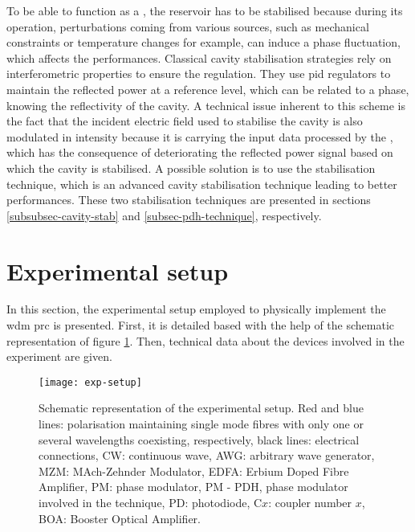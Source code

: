 To be able to function as a \rcer, the reservoir has to be stabilised because during its operation, perturbations coming from various sources, such as mechanical constraints or temperature changes for example, can induce a phase fluctuation, which affects the \rcer performances. Classical cavity stabilisation strategies rely on interferometric properties to ensure the regulation. They use \gls{pid} regulators to maintain the reflected power at a reference level, which can be related to a phase, knowing the reflectivity of the cavity. A technical issue inherent to this scheme is the fact that the incident electric field used to stabilise the cavity is also modulated in intensity because it is carrying the input data processed by the \rcer, which has the consequence of deteriorating the reflected power signal based on which the cavity is stabilised. A possible solution is to use the \pdh stabilisation technique, which is an advanced cavity stabilisation technique leading to better performances. These two stabilisation techniques are presented in sections \ref{subsubsec-cavity-stab} and \ref{subsec-pdh-technique}, respectively.


\section{Experimental setup}

In this section, the experimental setup employed to physically implement the \gls{wdm} \gls{prc} is presented. First, it is detailed based with the help of the schematic representation of figure \ref{exp-setup}. Then, technical data about the devices involved in the experiment are given.

\begin{figure}[h]
	\centering
	\texttt{[image: exp-setup]}
	\caption{Schematic representation of the experimental setup. Red and blue lines: polarisation maintaining single mode fibres with only one or several wavelengths coexisting, respectively, black lines: electrical connections, CW: continuous wave, AWG: arbitrary wave generator, MZM: MAch-Zehnder Modulator, EDFA: Erbium Doped Fibre Amplifier, PM: phase modulator, PM - PDH, phase modulator involved in the \pdh technique, PD: photodiode, C$x$: coupler number $x$, BOA: Booster Optical Amplifier.}
	\label{exp-setup}
\end{figure}

